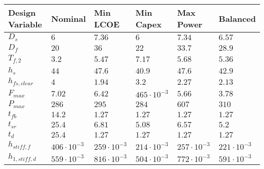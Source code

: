 \begin{tabular}{llllll}
Design Variable & Nominal & Min LCOE & Min Capex & Max Power & Balanced\\ 
\hline 
$D_s$ & $6 $ & $7.36 $ & $6 $ & $7.34 $ & $6.57 $ \\ 
$D_f$ & $20 $ & $36 $ & $22 $ & $33.7 $ & $28.9 $ \\ 
$T_{f,2}$ & $3.2 $ & $5.47 $ & $7.17 $ & $5.68 $ & $5.36 $ \\ 
$h_s$ & $44 $ & $47.6 $ & $40.9 $ & $47.6 $ & $42.9 $ \\ 
$h_{fs,clear}$ & $4 $ & $1.94 $ & $3.2 $ & $2.27 $ & $2.13 $ \\ 
$F_{max}$ & $7.02 $ & $6.42 $ & $465 \cdot 10^{-3}$ & $5.66 $ & $3.78 $ \\ 
$P_{max}$ & $286 $ & $295 $ & $284 $ & $607 $ & $310 $ \\ 
$t_{fb}$ & $14.2 $ & $1.27 $ & $1.27 $ & $1.27 $ & $1.27 $ \\ 
$t_{sr}$ & $25.4 $ & $6.81 $ & $5.08 $ & $6.57 $ & $5.2 $ \\ 
$t_d$ & $25.4 $ & $1.27 $ & $1.27 $ & $1.27 $ & $1.27 $ \\ 
$h_{stiff,f}$ & $406 \cdot 10^{-3}$ & $259 \cdot 10^{-3}$ & $214 \cdot 10^{-3}$ & $257 \cdot 10^{-3}$ & $221 \cdot 10^{-3}$ \\ 
$h_{1,stiff,d}$ & $559 \cdot 10^{-3}$ & $816 \cdot 10^{-3}$ & $504 \cdot 10^{-3}$ & $772 \cdot 10^{-3}$ & $591 \cdot 10^{-3}$ \\ 
\end{tabular}